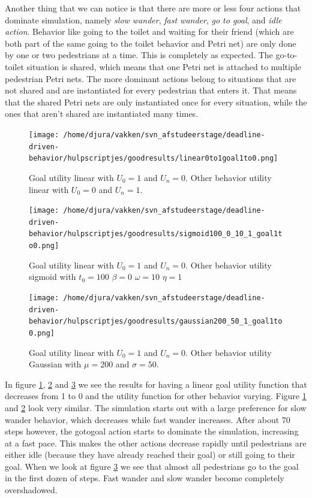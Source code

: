 \documentclass[11pt, a4paper]{book}
\begin{document}
Another thing that we can notice is that there are more or less four actions that dominate simulation, namely \emph{slow wander}, \emph{fast wander}, \emph{go to goal}, and \emph{idle action}.
 Behavior like going to the toilet and waiting for their friend (which are both part of the same going to the toilet behavior and Petri net) are only done by one or two pedestrians at a time. This is completely as expected. The go-to-toilet situation is shared, which means that one Petri net is attached to multiple pedestrian Petri nets. The more dominant actions belong to situations that are not shared and are instantiated for every pedestrian that enters it. That means that the shared Petri nets are only instantiated once for every situation, while the ones that aren't shared are instantiated many times.

\begin{figure}[h!]
\centering            
\texttt{[image: /home/djura/vakken/svn\_afstudeerstage/deadline-driven-behavior/hulpscriptjes/goodresults/linear0to1goal1to0.png]}
\caption{Goal utility linear with $U_0=1$ and $U_n = 0$. Other behavior utility linear with  $U_0=0$ and $U_n=1$.}
\label{fig:linear0to1goal1to0}
\end{figure} 

\begin{figure}[h!]
\centering
\texttt{[image: /home/djura/vakken/svn\_afstudeerstage/deadline-driven-behavior/hulpscriptjes/goodresults/sigmoid100\_0\_10\_1\_goal1to0.png]}
\caption{Goal utility linear with $U_0=1$ and $U_n = 0$. Other behavior utility sigmoid with $t_0=100$ $\beta=0$ $\omega=10$ $\eta=1$}
\label{fig:sigmoid100_0_10_1_goal1to0}
\end{figure}

\begin{figure}[h!]
\centering
\texttt{[image: /home/djura/vakken/svn\_afstudeerstage/deadline-driven-behavior/hulpscriptjes/goodresults/gaussian200\_50\_1\_goal1to0.png]}
\caption{Goal utility linear with $U_0=1$ and $U_n = 0$. Other behavior utility Gaussian with $\mu=200$ and $\sigma=50$.}
\label{fig:Gaussian200_50_1_goal1to0}
\end{figure}

In figure \ref{fig:linear0to1goal1to0}, \ref{fig:sigmoid100_0_10_1_goal1to0} and \ref{fig:Gaussian200_50_1_goal1to0} we see the results for having a linear goal utility function that decreases from 1 to 0 and the utility function for other behavior varying. Figure \ref{fig:linear0to1goal1to0} and \ref{fig:sigmoid100_0_10_1_goal1to0} look very similar. The simulation starts out with a large preference for slow wander behavior, which decreases while fast wander increases. After about 70 steps however, the gotogoal action starts to dominate the simulation, increasing at a fast pace. This makes the other actions decrease rapidly until pedestrians are either idle (because they have already reached their goal) or still going to their goal. When we look at figure \ref{fig:Gaussian200_50_1_goal1to0} we see that almost all pedestrians go to the goal in the first dozen of steps. Fast wander and slow wander become completely overshadowed.
\end{document}
